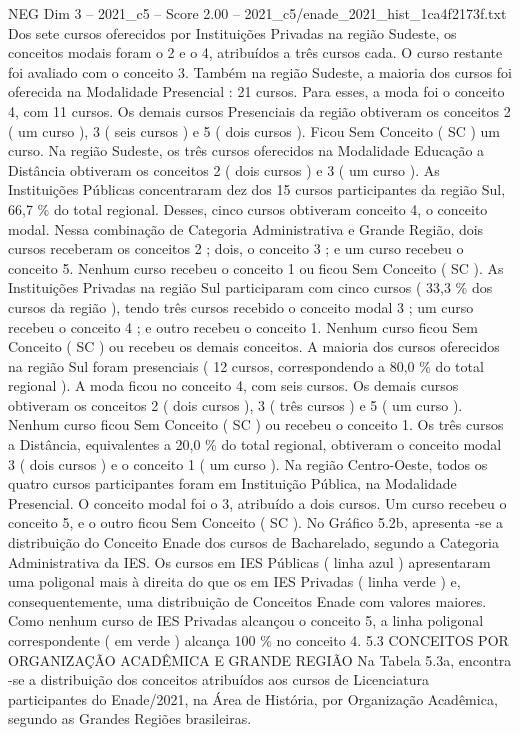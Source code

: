 \begin{textsample}{NEG Dim 3 – 2021\_c5 – Score 2.00 – 2021\_c5/enade\_2021\_hist\_1ca4f2173f.txt}
Dos sete cursos oferecidos por Instituições Privadas na região Sudeste, os conceitos modais foram o 2 e o 4, atribuídos a três cursos cada.
O curso restante foi avaliado com o conceito 3.
Também na região Sudeste, a maioria dos cursos foi oferecida na Modalidade Presencial : 21 cursos.
Para esses, a moda foi o conceito 4, com 11 cursos.
Os demais cursos Presenciais da região obtiveram os conceitos 2 ( um curso ), 3 ( seis cursos ) e 5 ( dois cursos ).
Ficou Sem Conceito ( SC ) um curso.
Na região Sudeste, os três cursos oferecidos na Modalidade Educação a Distância obtiveram os conceitos 2 ( dois cursos ) e 3 ( um curso ).
As Instituições Públicas concentraram dez dos 15 cursos participantes da região Sul, 66,7 \% do total regional.
Desses, cinco cursos obtiveram conceito 4, o conceito modal.
Nessa combinação de Categoria Administrativa e Grande Região, dois cursos receberam os conceitos 2 ; dois, o conceito 3 ; e um curso recebeu o conceito 5.
Nenhum curso recebeu o conceito 1 ou ficou Sem Conceito ( SC ).
As Instituições Privadas na região Sul participaram com cinco cursos ( 33,3 \% dos cursos da região ), tendo três cursos recebido o conceito modal 3 ; um curso recebeu o conceito 4 ; e outro recebeu o conceito 1.
Nenhum curso ficou Sem Conceito ( SC ) ou recebeu os demais conceitos.
A maioria dos cursos oferecidos na região Sul foram presenciais ( 12 cursos, correspondendo a 80,0 \% do total regional ).
A moda ficou no conceito 4, com seis cursos.
Os demais cursos obtiveram os conceitos 2 ( dois cursos ), 3 ( três cursos ) e 5 ( um curso ).
Nenhum curso ficou Sem Conceito ( SC ) ou recebeu o conceito 1.
Os três cursos a Distância, equivalentes a 20,0 \% do total regional, obtiveram o conceito modal 3 ( dois cursos ) e o conceito 1 ( um curso ).
Na região Centro-Oeste, todos os quatro cursos participantes foram em Instituição Pública, na Modalidade Presencial.
O conceito modal foi o 3, atribuído a dois cursos.
Um curso recebeu o conceito 5, e o outro ficou Sem Conceito ( SC ).
No Gráfico 5.2b, apresenta -se a distribuição do Conceito Enade dos cursos de Bacharelado, segundo a Categoria Administrativa da IES.
Os cursos em IES Públicas ( linha azul ) apresentaram uma poligonal mais à direita do que os em IES Privadas ( linha verde ) e, consequentemente, uma distribuição de Conceitos Enade com valores maiores.
Como nenhum curso de IES Privadas alcançou o conceito 5, a linha poligonal correspondente ( em verde ) alcança 100 \% no conceito 4. 5.3 CONCEITOS POR ORGANIZAÇÃO ACADÊMICA E GRANDE REGIÃO Na Tabela 5.3a, encontra -se a distribuição dos conceitos atribuídos aos cursos de Licenciatura participantes do Enade/2021, na Área de História, por Organização Acadêmica, segundo as Grandes Regiões brasileiras.

\end{textsample}
